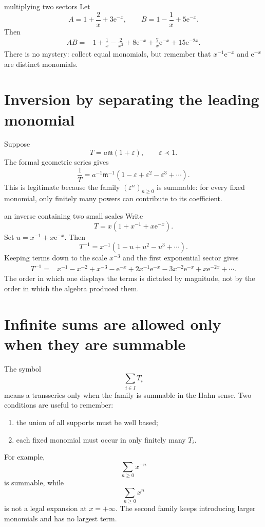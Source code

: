 \documentclass[11pt,openany]{book}
\theoremstyle{plain}
\theoremstyle{definition}
\theoremstyle{remark}
\newcommand{\m}{\mathfrak{m}}
\newcommand{\e}{\mathrm{e}}
\begin{document}
\begin{workedbox}{multiplying two sectors}
Let
\[
  A=1+\frac{2}{x}+3\e^{-x},
  \qquad
  B=1-\frac{1}{x}+5\e^{-x}.
\]
Then
\begin{align*}
  AB={}&1+\frac1x-\frac{2}{x^2}
       +8\e^{-x}+\frac{7}{x}\e^{-x}
       +15\e^{-2x}.
\end{align*}
There is no mystery: collect equal monomials, but remember that
$x^{-1}\e^{-x}$ and $\e^{-x}$ are distinct monomials.
\end{workedbox}

\section{Inversion by separating the leading monomial}
Suppose
\[
  T=a\m(1+\varepsilon),
  \qquad \varepsilon\prec1.
\]
The formal geometric series gives
\[
  \frac1T=a^{-1}\m^{-1}
  \left(1-\varepsilon+\varepsilon^2-\varepsilon^3+\cdots\right).
\]
This is legitimate because the family $(\varepsilon^n)_{n\ge0}$ is summable: for every fixed monomial, only finitely many powers can contribute to its coefficient.

\begin{workedbox}{an inverse containing two small scales}
Write
\[
  T=x\left(1+x^{-1}+x\e^{-x}\right).
\]
Set $u=x^{-1}+x\e^{-x}$. Then
\[
  T^{-1}=x^{-1}(1-u+u^2-u^3+\cdots).
\]
Keeping terms down to the scale $x^{-3}$ and the first exponential sector gives
\begin{align*}
  T^{-1}
  ={}&x^{-1}-x^{-2}+x^{-3}
      -\e^{-x}+2x^{-1}\e^{-x}
      -3x^{-2}\e^{-x}
      +x\e^{-2x}+\cdots.
\end{align*}
The order in which one displays the terms is dictated by magnitude, not by the order in which the algebra produced them.
\end{workedbox}

\section{Infinite sums are allowed only when they are summable}
The symbol
\[
  \sum_{i\in I}T_i
\]
means a transseries only when the family is summable in the Hahn sense. Two conditions are useful to remember:
\begin{enumerate}
\item the union of all supports must be well based;
\item each fixed monomial must occur in only finitely many $T_i$.
\end{enumerate}
For example,
\[
  \sum_{n\ge0}x^{-n}
\]
is summable, while
\[
  \sum_{n\ge0}x^n
\]
is not a legal expansion at $x=+\infty$. The second family keeps introducing larger monomials and has no largest term.
\end{document}
